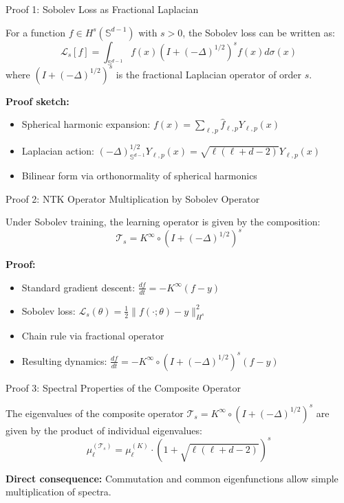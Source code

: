 \documentclass{beamer}
\begin{document}
\begin{frame}{Proof 1: Sobolev Loss as Fractional Laplacian}
\begin{theorem}
For a function $f \in H^s(\mathbb{S}^{d-1})$ with $s > 0$, the Sobolev loss can be written as:
\[ \mathcal{L}_s[f] = \int_{\mathbb{S}^{d-1}} f(x) (I + (-\Delta)^{1/2})^s f(x) d\sigma(x) \]
where $(I + (-\Delta)^{1/2})^s$ is the fractional Laplacian operator of order $s$.
\end{theorem}

\textbf{Proof sketch:}
\begin{itemize}
\item Spherical harmonic expansion: $f(x) = \sum_{\ell,p} \hat{f}_{\ell,p} Y_{\ell,p}(x)$
\item Laplacian action: $(-\Delta)^{1/2}_{\mathbb{S}^{d-1}} Y_{\ell,p}(x) = \sqrt{\ell(\ell + d - 2)} Y_{\ell,p}(x)$
\item Bilinear form via orthonormality of spherical harmonics
\end{itemize}
\end{frame}

\begin{frame}{Proof 2: NTK Operator Multiplication by Sobolev Operator}
\begin{theorem}
Under Sobolev training, the learning operator is given by the composition:
\[ \mathcal{T}_s = K^{\infty} \circ (I + (-\Delta)^{1/2})^s \]
\end{theorem}

\textbf{Proof:}
\begin{itemize}
\item Standard gradient descent: $\frac{df}{dt} = -K^{\infty}(f - y)$
\item Sobolev loss: $\mathcal{L}_s(\theta) = \frac{1}{2}\|f(\cdot; \theta) - y\|^2_{H^s}$
\item Chain rule via fractional operator
\item Resulting dynamics: $\frac{df}{dt} = -K^{\infty} \circ (I + (-\Delta)^{1/2})^s (f - y)$
\end{itemize}
\end{frame}

\begin{frame}{Proof 3: Spectral Properties of the Composite Operator}
\begin{theorem}
The eigenvalues of the composite operator $\mathcal{T}_s = K^{\infty} \circ (I + (-\Delta)^{1/2})^s$ are given by the product of individual eigenvalues:
\[ \mu_\ell^{(\mathcal{T}_s)} = \mu_\ell^{(K)} \cdot (1 + \sqrt{\ell(\ell + d - 2)})^s \]
\end{theorem}

\textbf{Direct consequence:} Commutation and common eigenfunctions allow simple multiplication of spectra.
\end{frame}
\end{document}
